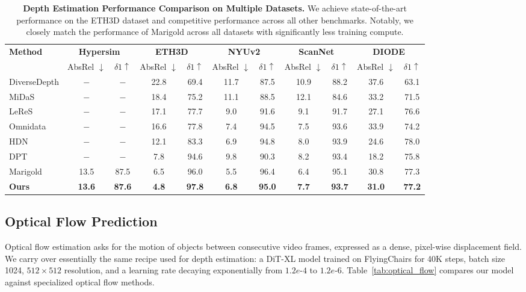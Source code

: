 \documentclass[manuscript,screen,review]{acmart}
\begin{document}
\begin{table}[htbp]
\centering
\begin{tabular}{lcccccccccc}
\toprule
\textbf{Method} & \multicolumn{2}{c}{\textbf{Hypersim}} & \multicolumn{2}{c}{\textbf{ETH3D}} & \multicolumn{2}{c}{\textbf{NYUv2}} & \multicolumn{2}{c}{\textbf{ScanNet}} & \multicolumn{2}{c}{\textbf{DIODE}} \\
& AbsRel $\downarrow$ & $\delta 1 \uparrow$ & AbsRel $\downarrow$ & $\delta 1 \uparrow$ & AbsRel $\downarrow$ & $\delta 1 \uparrow$ & AbsRel $\downarrow$ & $\delta 1 \uparrow$ & AbsRel $\downarrow$ & $\delta 1 \uparrow$ \\
\midrule
DiverseDepth & $-$   & $-$   & 22.8 & 69.4 & 11.7 & 87.5 & 10.9 & 88.2 & 37.6 & 63.1 \\
MiDaS        & $-$   & $-$   & 18.4 & 75.2 & 11.1 & 88.5 & 12.1 & 84.6 & 33.2 & 71.5 \\
LeReS        & $-$   & $-$   & 17.1 & 77.7 & 9.0  & 91.6 & 9.1  & 91.7 & 27.1 & 76.6 \\
Omnidata     & $-$   & $-$   & 16.6 & 77.8 & 7.4  & 94.5 & 7.5  & 93.6 & 33.9 & 74.2 \\
HDN          & $-$   & $-$   & 12.1 & 83.3 & 6.9  & 94.8 & 8.0  & 93.9 & 24.6 & 78.0 \\
DPT          & $-$   & $-$   & 7.8  & 94.6 & 9.8  & 90.3 & 8.2  & 93.4 & 18.2 & 75.8 \\
Marigold     & 13.5 & 87.5  & 6.5  & 96.0 & 5.5  & 96.4 & 6.4  & 95.1 & 30.8 & 77.3 \\
\midrule
\textbf{Ours}& \textbf{13.6} & \textbf{87.6} & \textbf{4.8} & \textbf{97.8} & \textbf{6.8} & \textbf{95.0} & \textbf{7.7} & \textbf{93.7} & \textbf{31.0} & \textbf{77.2} \\
\bottomrule
\end{tabular}
\caption{\textbf{Depth Estimation Performance Comparison on Multiple Datasets.} We achieve state-of-the-art performance on the ETH3D dataset and competitive performance across all other benchmarks. Notably, we closely match the performance of Marigold across all datasets with significantly less training compute.}
\label{tab:depth_performance}
\end{table}
\subsection{Optical Flow Prediction}

Optical flow estimation asks for the motion of objects between consecutive video frames, expressed as a dense, pixel-wise displacement field. We carry over essentially the same recipe used for depth estimation: a DiT-XL model trained on FlyingChairs for 40K steps, batch size 1024, $512\times512$ resolution, and a learning rate decaying exponentially from $1.2e\text{-}4$ to $1.2e\text{-}6$. Table~\ref{tab:optical_flow} compares our model against specialized optical flow methods.
\end{document}
